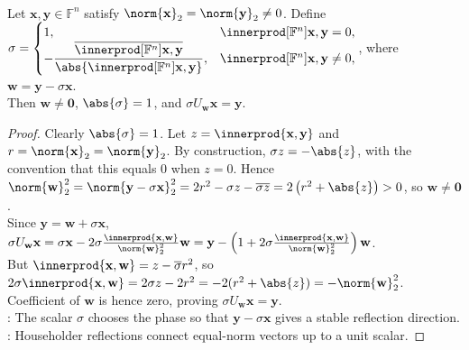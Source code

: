 \begin{theorem} \label{thm:householder-maps-equal-norm-vectors} \\
Let $\mathbf{x},\mathbf{y}\in\mathbb{F}^n$ satisfy $\norm{\mathbf{x}}_2=\norm{\mathbf{y}}_2\neq0$. Define $\sigma=
\begin{cases}
1, & \innerprod[\mathbb{F}^n]{\mathbf{x},\mathbf{y}}=0,\\
-\dfrac{\overline{\innerprod[\mathbb{F}^n]{\mathbf{x},\mathbf{y}}}}{\abs{\innerprod[\mathbb{F}^n]{\mathbf{x},\mathbf{y}}}}, & \innerprod[\mathbb{F}^n]{\mathbf{x},\mathbf{y}}\neq0,
\end{cases}$, where $\mathbf{w}=\mathbf{y}-\sigma\mathbf{x}$.\\
Then $\mathbf{w}\neq\mathbf{0}$, $\abs{\sigma}=1$, and $\sigma U_{\mathbf{w}}\mathbf{x}=\mathbf{y}$.
\begin{proof}
Clearly $\abs{\sigma}=1$. Let $z=\innerprod{\mathbf{x},\mathbf{y}}$ and $r=\norm{\mathbf{x}}_2=\norm{\mathbf{y}}_2$. By construction, $\sigma z=-\abs{z}$, with the convention that this equals $0$ when $z=0$. Hence $\norm{\mathbf{w}}_2^2 =\norm{\mathbf{y}-\sigma\mathbf{x}}_2^2 =2r^2-\sigma z-\overline{\sigma z} =2\left(r^2+\abs{z}\right)>0$, so $\mathbf{w}\neq\mathbf{0}$.\\
Since $\mathbf{y}=\mathbf{w}+\sigma\mathbf{x}$, $\sigma U_{\mathbf{w}}\mathbf{x} =\sigma\mathbf{x}-2\sigma\frac{\innerprod{\mathbf{x},\mathbf{w}}}{\norm{\mathbf{w}}_2^2}\mathbf{w} =\mathbf{y}-\left(1+2\sigma\frac{\innerprod{\mathbf{x},\mathbf{w}}}{\norm{\mathbf{w}}_2^2}\right)\mathbf{w}$.\\
But $\innerprod{\mathbf{x},\mathbf{w}}=z-\overline{\sigma}r^2$, so $2\sigma\innerprod{\mathbf{x},\mathbf{w}}=2\sigma z-2r^2=-2(r^2+\abs{z})=-\norm{\mathbf{w}}_2^2$.\\
Coefficient of $\mathbf{w}$ is hence zero, proving $\sigma U_{\mathbf{w}}\mathbf{x}=\mathbf{y}$.\\
: The scalar $\sigma$ chooses the phase so that $\mathbf{y}-\sigma\mathbf{x}$ gives a stable reflection direction.\\
: Householder reflections connect equal-norm vectors up to a unit scalar.
\end{proof}
\end{theorem}

